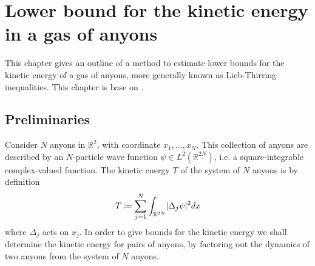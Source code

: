 \documentclass[a4paper,10pt,oneside]{book}
\theoremstyle{plain}
\theoremstyle{definition}
\theoremstyle{remark}
\DeclarePairedDelimiter\abs{\lvert}{\rvert}
\begin{document}








































\chapter{Lower bound for the kinetic energy in a gas of anyons}\label{chap:kinetic energy}

This chapter gives an outline of a method to estimate lower bounds for the kinetic energy of a gas of anyons, more generally known as Lieb-Thirring inequalities. This chapter is base on \cite{lundholm-solovej}.

\section{Preliminaries}

Consider $N$ anyons in $\mathbb{R}^2$, with coordinate $x_1, \ldots, x_N$. This collection of anyons are described by an $N$-particle wave function $\psi \in L^2(\mathbb{R}^{2N})$, i.e. a square-integrable complex-valued function. The kinetic energy $T$ of the system of $N$ anyons is by definition
\begin{align*} %
  T \coloneqq \sum_{j=1}^N \int_{\mathbb{R}^{2N}} \abs{\Delta_j \psi}^2 dx
\end{align*}
where $\Delta_j$ acts on $x_j$.
In order to give bounds for the kinetic energy we shall determine the kinetic energy for pairs of anyons, by factoring out the dynamics of two anyons from the system of $N$ anyons.
\end{document}
